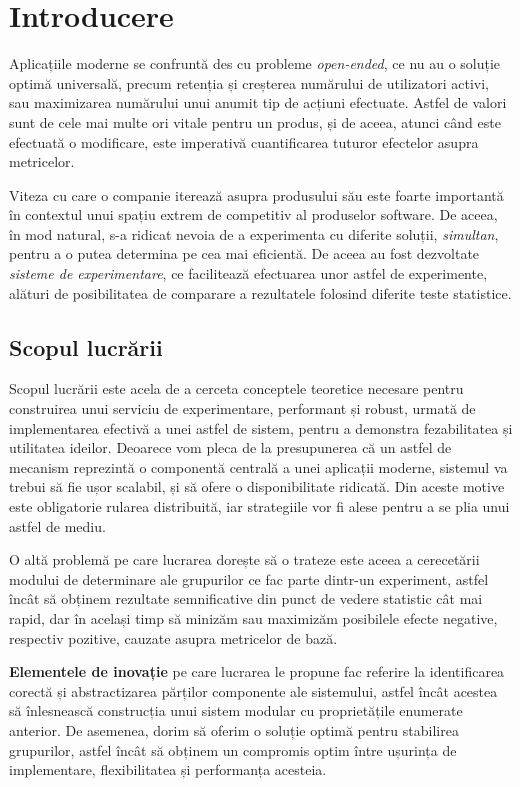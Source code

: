 \chapter{Introducere}

Aplicațiile moderne se confruntă des cu probleme \textit{open-ended}, ce nu au o soluție optimă universală, precum retenția și creșterea numărului de utilizatori activi, sau maximizarea numărului unui anumit tip de acțiuni efectuate. Astfel de valori sunt de cele mai multe ori vitale pentru un produs, și de aceea, atunci când este efectuată o modificare, este imperativă cuantificarea tuturor efectelor asupra metricelor.

Viteza cu care o companie iterează asupra produsului său este foarte importantă în contextul unui spațiu extrem de competitiv al produselor software. De aceea, în mod natural, s-a ridicat nevoia de a experimenta cu diferite soluții, \textit{simultan}, pentru a o putea determina pe cea mai eficientă. De aceea au fost dezvoltate \textit{sisteme de experimentare}, ce facilitează efectuarea unor astfel de experimente, alături de posibilitatea de comparare a rezultatele folosind diferite teste statistice.

\section{Scopul lucrării}

Scopul lucrării este acela de a cerceta conceptele teoretice necesare pentru construirea unui serviciu de experimentare, performant și robust, urmată de implementarea efectivă a unei astfel de sistem, pentru a demonstra fezabilitatea și utilitatea ideilor. Deoarece vom pleca de la presupunerea că un astfel de mecanism reprezintă o componentă centrală a unei aplicații moderne, sistemul va trebui să fie ușor scalabil, și să ofere o disponibilitate ridicată. Din aceste motive este obligatorie rularea distribuită, iar strategiile vor fi alese pentru a se plia unui astfel de mediu.

O altă problemă pe care lucrarea dorește să o trateze este aceea a cerecetării modului de determinare ale grupurilor ce fac parte dintr-un experiment, astfel încât să obținem rezultate semnificative din punct de vedere statistic cât mai rapid, dar în același timp să minizăm sau maximizăm posibilele efecte negative, respectiv pozitive, cauzate asupra metricelor de bază. 

\textbf{Elementele de inovație} pe care lucrarea le propune fac referire la identificarea corectă și abstractizarea părților componente ale sistemului, astfel încât acestea să înlesnească construcția unui sistem modular cu proprietățile enumerate anterior. De asemenea, dorim să oferim o soluție optimă pentru stabilirea grupurilor, astfel încât să obținem un compromis optim între ușurința de implementare, flexibilitatea și performanța acesteia.

